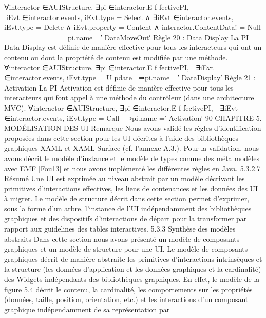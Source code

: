 \documentclass{article}
\begin{document}
∀interactor ∈AUIStructure,
∃pi ∈interactor.E f fectivePI,














∃iEvt ∈interactor.events,
iEvt.type = Select
∧
∃iEvt ∈interactor.events,
iEvt.type = Delete
∧
iEvt.property = Content
∧
interactor.ContentData! = Null














⇒pi.name =′ DataMoveOut′
R\`{e}gle 20 : Data Display
La PI Data Display est d\'{e}ﬁnie de mani\`{e}re effective pour tous les interacteurs qui ont un contenu
ou dont la propri\'{e}t\'{e} de contenu est modiﬁ\'{e}e par une m\'{e}thode.
∀interactor ∈AUIStructure, ∃pi ∈interactor.E f fectivePI,
 ∃iEvt ∈interactor.events,
iEvt.type = U pdate

⇒pi.name =′ DataDisplay′
R\`{e}gle 21 : Activation
La PI Activation est d\'{e}ﬁnie de mani\`{e}re effective pour tous les interacteurs qui font appel \`{a} une
m\'{e}thode du contr\^{o}leur (dans une architecture MVC).
∀interactor ∈AUIStructure, ∃pi ∈interactor.E f fectivePI,
 ∃iEvt ∈interactor.events,
iEvt.type = Call

⇒pi.name =′ Activation′
90
CHAPITRE 5. MODÉLISATION DES UI
Remarque
Nous avons valid\'{e} les r\`{e}gles d’identiﬁcation propos\'{e}es dans cette section pour les UI
d\'{e}crites \`{a} l’aide des biblioth\`{e}ques graphiques XAML et XAML Surface (cf. l’annexe A.3.). Pour la
validation, nous avons d\'{e}crit le mod\`{e}le d’instance et le mod\`{e}le de types comme des m\'{e}ta mod\`{e}les
avec EMF [Fou13] et nous avons impl\'{e}ment\'{e} les diff\'{e}rentes r\`{e}gles en Java.
5.3.2.7
R\'{e}sum\'{e}
Une UI est exprim\'{e}e au niveau abstrait par un mod\`{e}le d\'{e}crivant les primitives d’interactions effectives, les liens de contenances et les donn\'{e}es des UI \`{a} migrer.
Le mod\`{e}le de structure d\'{e}crit dans cette section permet d’exprimer, sous la forme d’un arbre,
l’instance de l’UI ind\'{e}pendamment des biblioth\`{e}ques graphiques et des dispositifs d’interactions de
d\'{e}part pour la transformer par rapport aux guidelines des tables interactives.
5.3.3
Synth\`{e}se des mod\`{e}les abstraits
Dans cette section nous avons pr\'{e}sent\'{e} un mod\`{e}le de composants graphiques et un mod\`{e}le de
structure pour une UI. Le mod\`{e}le de composants graphiques d\'{e}crit de mani\`{e}re abstraite les primitives
d’interactions intrins\`{e}ques et la structure (les donn\'{e}es d’application et les donn\'{e}es graphiques et la
cardinalit\'{e}) des Widgets ind\'{e}pendants des biblioth\`{e}ques graphiques. En effet, le mod\`{e}le de la ﬁgure 5.4
d\'{e}crit le contenu, la cardinalit\'{e}, les comportements sur les propri\'{e}t\'{e}s (donn\'{e}es, taille, position, orientation, etc.) et les interactions d’un composant graphique ind\'{e}pendamment de sa repr\'{e}sentation par
\end{document}
